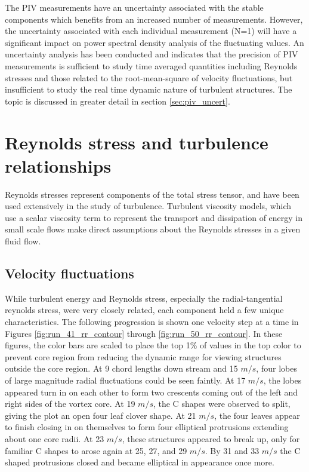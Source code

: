 The PIV measurements have an uncertainty associated with the stable components 
which benefits from an increased number of measurements. However, the 
uncertainty associated with each individual measurement (N=1) will have a 
significant impact on power spectral density analysis of the fluctuating 
values. An uncertainty analysis has been conducted and indicates that the 
precision of PIV measurements is sufficient to study time averaged quantities 
including Reynolds stresses and those related to the root-mean-square of 
velocity fluctuations, but insufficient to study the real time dynamic nature 
of turbulent structures. The topic is discussed in greater detail in section 
\ref{sec:piv_uncert}.

\section{Reynolds stress and turbulence relationships}

Reynolds stresses represent components of the total stress tensor, and have 
been used extensively in the study of turbulence. Turbulent viscosity models, 
which use a scalar viscosity term to represent the transport and dissipation of 
energy in small scale flows make direct assumptions about the Reynolds stresses 
in a given fluid flow. 

\subsection{Velocity fluctuations}

While turbulent energy and Reynolds stress, especially the radial-tangential 
reynolds stress, were very closely related, each component held a few unique 
characteristics. The following progression is shown one velocity step at 
a time in Figures \ref{fig:run_41_rr_contour} through 
\ref{fig:run_50_rr_contour}. In these figures, the color bars are scaled to 
place the top 1\% of values in the top color to prevent core region from 
reducing the dynamic range for viewing structures outside the core region.
At 9 chord lengths down stream and 15 $m/s$, four lobes of 
large magnitude radial fluctuations could be seen faintly. At 17 $m/s$, the 
lobes appeared turn in on each other to form two crescents coming out of the 
left and right sides of the vortex core. At 19 $m/s$, the C shapes were 
observed to split, giving the plot an open four leaf clover shape. At 21 $m/s$, 
the four leaves appear to finish closing in on themselves to form four 
elliptical protrusions extending about one core radii. At 23 $m/s$, these 
structures appeared to break up, only for familiar C shapes to arose again at 
25, 27, and 29 $m/s$. By 31 and 33 $m/s$ the C shaped protrusions closed and 
became elliptical in appearance once more. 


